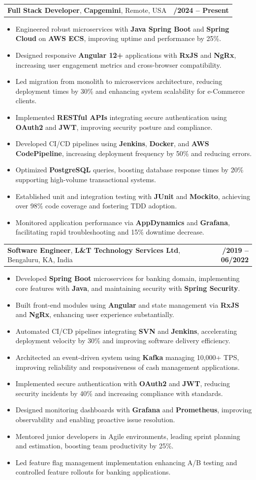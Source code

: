 \documentclass[letterpaper,11pt]{article}
\makeatletter
\newcommand{\resumeItem}[1]{
  \item\footnotesize{
    {#1 \vspace{-2pt}}
  }
}
\newcommand{\resumeSubheading}[4]{
  \vspace{-2pt}\item
    \begin{tabular*}{1.0\textwidth}[t]{l@{\extracolsep{\fill}}r}
      \textbf{\fontsize{10pt}{14pt}\selectfont #3}, \textbf{\fontsize{10pt}{14pt}\selectfont #1}, \fontsize{10pt}{14pt}\selectfont #4 & \textbf{\fontsize{10pt}{14pt}\selectfont #2} \\
    \end{tabular*}\vspace{-7pt}
}
\newcommand{\resumeItemListStart}{\begin{itemize}[leftmargin=*]}
\newcommand{\resumeItemListEnd}{\end{itemize}\vspace{-5pt}}
\makeatother
\begin{document}
    \resumeSubheading
        {Capgemini}{01/2024 -- Present}
        {Full Stack Developer}{Remote, USA}
      \resumeItemListStart
        \resumeItem{Engineered robust microservices with \textbf{Java Spring Boot} and \textbf{Spring Cloud} on \textbf{AWS ECS}, improving uptime and performance by 25\%.}
        \resumeItem{Designed responsive \textbf{Angular 12+} applications with \textbf{RxJS} and \textbf{NgRx}, increasing user engagement metrics and cross-browser compatibility.}
        \resumeItem{Led migration from monolith to microservices architecture, reducing deployment times by 30\% and enhancing system scalability for e-Commerce clients.}
        \resumeItem{Implemented \textbf{RESTful APIs} integrating secure authentication using \textbf{OAuth2} and \textbf{JWT}, improving security posture and compliance.}
        \resumeItem{Developed CI/CD pipelines using \textbf{Jenkins}, \textbf{Docker}, and \textbf{AWS CodePipeline}, increasing deployment frequency by 50\% and reducing errors.}
        \resumeItem{Optimized \textbf{PostgreSQL} queries, boosting database response times by 20\% supporting high-volume transactional systems.}
        \resumeItem{Established unit and integration testing with \textbf{JUnit} and \textbf{Mockito}, achieving over 98\% code coverage and fostering TDD adoption.}
        \resumeItem{Monitored application performance via \textbf{AppDynamics} and \textbf{Grafana}, facilitating rapid troubleshooting and 15\% downtime decrease.}
      \resumeItemListEnd

    \resumeSubheading
        {L\&T Technology Services Ltd}{08/2019 -- 06/2022}
        {Software Engineer}{Bengaluru, KA, India}
      \resumeItemListStart
        \resumeItem{Developed \textbf{Spring Boot} microservices for banking domain, implementing core features with \textbf{Java}, and maintaining security with \textbf{Spring Security}.}
        \resumeItem{Built front-end modules using \textbf{Angular} and state management via \textbf{RxJS} and \textbf{NgRx}, enhancing user experience substantially.}
        \resumeItem{Automated CI/CD pipelines integrating \textbf{SVN} and \textbf{Jenkins}, accelerating deployment velocity by 30\% and improving software delivery efficiency.}
        \resumeItem{Architected an event-driven system using \textbf{Kafka} managing 10,000+ TPS, improving reliability and responsiveness of cash management applications.}
        \resumeItem{Implemented secure authentication with \textbf{OAuth2} and \textbf{JWT}, reducing security incidents by 40\% and increasing compliance with standards.}
        \resumeItem{Designed monitoring dashboards with \textbf{Grafana} and \textbf{Prometheus}, improving observability and enabling proactive issue resolution.}
        \resumeItem{Mentored junior developers in Agile environments, leading sprint planning and estimation, boosting team productivity by 25\%.}
        \resumeItem{Led feature flag management implementation enhancing A/B testing and controlled feature rollouts for banking applications.}
      \resumeItemListEnd
\end{document}
